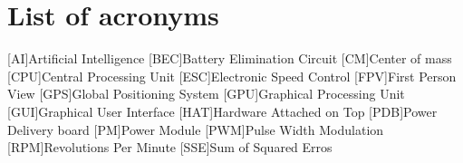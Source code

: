 \chapter*{List of acronyms}
\begin{acronym} 
    [AI]{Artificial Intelligence}
    [BEC]{Battery Elimination Circuit}
    [CM]{Center of mass}
    [CPU]{Central Processing Unit}
    [ESC]{Electronic Speed Control}
    [FPV]{First Person View}
    [GPS]{Global Positioning System}
    [GPU]{Graphical Processing Unit}
    [GUI]{Graphical User Interface}
    [HAT]{Hardware Attached on Top}
    [PDB]{Power Delivery board}
    [PM]{Power Module}
    [PWM]{Pulse Width Modulation}
    [RPM]{Revolutions Per Minute}
    [SSE]{Sum of Squared Erros}
\end{acronym}